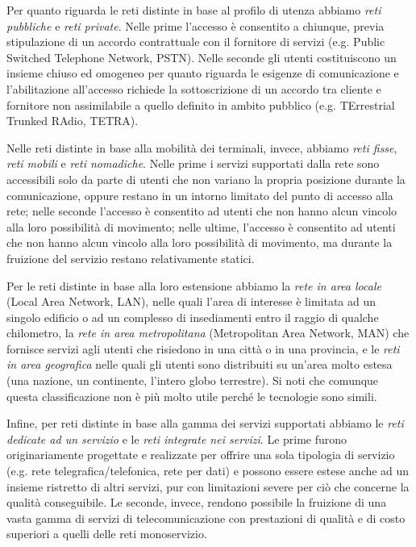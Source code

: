 Per quanto riguarda le reti distinte in base al profilo di utenza abbiamo \textit{reti pubbliche} e \textit{reti private}. Nelle prime l'accesso è consentito a chiunque, previa stipulazione di un accordo contrattuale con il fornitore di servizi (e.g. Public Switched Telephone Network, PSTN). Nelle seconde gli utenti costituiscono un insieme chiuso ed omogeneo per quanto riguarda le esigenze di comunicazione e l'abilitazione all'accesso richiede la sottoscrizione di un accordo tra cliente e fornitore non assimilabile a quello definito in ambito pubblico (e.g. TErrestrial Trunked RAdio, TETRA).

Nelle reti distinte in base alla mobilità dei terminali, invece, abbiamo \textit{reti fisse}, \textit{reti mobili} e \textit{reti nomadiche}. Nelle prime i servizi supportati dalla rete sono accessibili solo da parte di utenti che non variano la propria posizione durante la comunicazione, oppure restano in un intorno limitato del punto di accesso alla rete; nelle seconde l'accesso è consentito ad utenti che non hanno alcun vincolo alla loro possibilità di movimento; nelle ultime, l'accesso è consentito ad utenti che non hanno alcun vincolo alla loro possibilità di movimento, ma durante la fruizione del servizio restano relativamente statici.

Per le reti distinte in base alla loro estensione abbiamo la \textit{rete in area locale} (Local Area Network, LAN), nelle quali l'area di interesse è limitata ad un singolo edificio o ad un complesso di insediamenti entro il raggio di qualche chilometro, la \textit{rete in area metropolitana} (Metropolitan Area Network, MAN) che fornisce servizi agli utenti che risiedono in una città o in una provincia, e le \textit{reti in area geografica} nelle quali gli utenti sono distribuiti su un'area molto estesa (una nazione, un continente, l'intero globo terrestre). Si noti che comunque questa classificazione non è più molto utile perché le tecnologie sono simili.

Infine, per reti distinte in base alla gamma dei servizi supportati abbiamo le \textit{reti dedicate ad un servizio} e le \textit{reti integrate nei servizi}. Le prime furono originariamente progettate e realizzate per offrire una sola tipologia di servizio (e.g. rete telegrafica/telefonica, rete per dati) e possono essere estese anche ad un insieme ristretto di altri servizi, pur con limitazioni severe per ciò che concerne la qualità conseguibile. Le seconde, invece, rendono possibile la fruizione di una vasta gamma di servizi di telecomunicazione con prestazioni di qualità e di costo superiori a quelli delle reti monoservizio.

